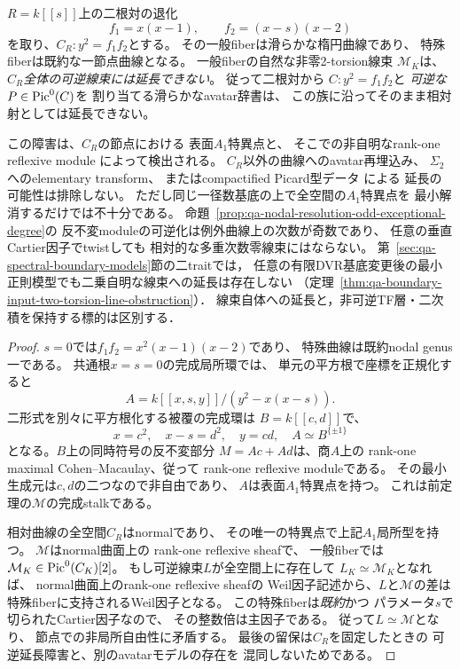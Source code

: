\begin{proposition}[共有根退化での可逆Picard延長の局所障害]
\label{prop:qa-rootpair-nodal-picard-nonextension}
$R=k[[s]]$上の二根対の退化
\[
 f_1=x(x-1),\qquad f_2=(x-s)(x-2)
\]
を取り、$C_R:y^2=f_1f_2$とする。
その一般fiberは滑らかな楕円曲線であり、
特殊fiberは既約な一節点曲線となる。
一般fiberの自然な非零2-torsion線束
$\mathcal M_K$は、
\emph{$C_R$全体の可逆線束には延長できない}。
従って二根対から
$C:y^2=f_1f_2$と
\emph{可逆な}$P\in\operatorname{Pic}^0(C)$を
割り当てる滑らかなavatar辞書は、
この族に沿ってそのまま相対射としては延長できない。

この障害は、$C_R$の節点における
表面$A_1$特異点と、
そこでの非自明なrank-one reflexive module
によって検出される。
$C_R$以外の曲線へのavatar再埋込み、
$\Sigma_2$へのelementary transform、
またはcompactified Picard型データ
\cite{AltmanKleiman1980}による
延長の可能性は排除しない。
ただし同じ一径数基底の上で全空間の$A_1$特異点を
最小解消するだけでは不十分である。
命題~\ref{prop:qa-nodal-resolution-odd-exceptional-degree}の
反不変moduleの可逆化は例外曲線上の次数が奇数であり、
任意の垂直Cartier因子でtwistしても
相対的な多重次数零線束にはならない。
第~\ref{sec:qa-spectral-boundary-models}節の二traitでは，
任意の有限DVR基底変更後の最小正則模型でも二乗自明な線束への延長は存在しない
（定理~\ref{thm:qa-boundary-input-two-torsion-line-obstruction}）．
線束自体への延長と，非可逆TF層・二次積を保持する標的は区別する．
\end{proposition}
\begin{proof}
$s=0$では$f_1f_2=x^2(x-1)(x-2)$であり、
特殊曲線は既約nodal genus一である。
共通根$x=s=0$の完成局所環では、
単元の平方根で座標を正規化すると
\[
 A=k[[x,s,y]]/(y^2-x(x-s)).
\]
二形式を別々に平方根化する被覆の完成環は
$B=k[[c,d]]$で、
\[
 x=c^2,\quad x-s=d^2,\quad y=cd,\quad
 A\simeq B^{\{\pm1\}}
\]
となる。$B$上の同時符号の反不変部分
$M=Ac+Ad$は、商$A$上の
rank-one maximal Cohen--Macaulay、従って
rank-one reflexive moduleである。
その最小生成元は$c,d$の二つなので非自由であり、
$A$は表面$A_1$特異点を持つ。
これは前定理の$\mathcal M$の完成stalkである。

相対曲線の全空間$C_R$はnormalであり、
その唯一の特異点で上記$A_1$局所型を持つ。
$\mathcal M$はnormal曲面上の
rank-one reflexive sheafで、
一般fiberでは$\mathcal M_K\in\operatorname{Pic}^0(C_K)[2]$。
もし可逆線束$L$が全空間上に存在して
$L_K\simeq\mathcal M_K$となれば、
normal曲面上のrank-one reflexive sheafの
Weil因子記述から、$L$と$\mathcal M$の差は
特殊fiberに支持されるWeil因子となる。
この特殊fiberは\emph{既約}かつ
パラメータ$s$で切られたCartier因子なので、
その整数倍は主因子である。
従って$L\simeq\mathcal M$となり、
節点での非局所自由性に矛盾する。
最後の留保は$C_R$を固定したときの
可逆延長障害と、別のavatarモデルの存在を
混同しないためである。
\end{proof}

